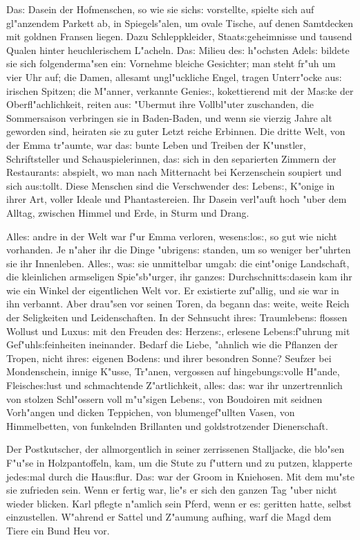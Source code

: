 \documentclass[oneside,12pt]{book}
\newcommand{\s}{s:}%
\begin{document}
Da{\s} Dasein der Hofmenschen, so wie sie sich{\s} vorstellte,
spielte sich auf gl"anzendem Parkett ab, in Spiegels"alen, um
ovale Tische, auf denen Samtdecken mit goldnen Fransen liegen.
Dazu Schleppkleider, Staat{\s}geheimnisse und tausend Qualen
hinter heuchlerischem L"acheln. Da{\s} Milieu de{\s} h"ochsten
Adel{\s} bildete sie sich folgenderma"sen ein: Vornehme bleiche
Gesichter; man steht fr"uh um vier Uhr auf; die Damen, allesamt
ungl"uckliche Engel, tragen Unterr"ocke au{\s} irischen Spitzen;
die M"anner, verkannte Genie{\s}, kokettierend mit der Ma{\s}ke
der Oberfl"achlichkeit, reiten au{\s} "Ubermut ihre Vollbl"uter
zuschanden, die Sommersaison verbringen sie in Baden-Baden, und
wenn sie vierzig Jahre alt geworden sind, heiraten sie zu guter
Letzt reiche Erbinnen. Die dritte Welt, von der Emma tr"aumte, war
da{\s} bunte Leben und Treiben der K"unstler, Schriftsteller und
Schauspielerinnen, da{\s} sich in den separierten Zimmern der
Restaurant{\s} abspielt, wo man nach Mitternacht bei Kerzenschein
soupiert und sich au{\s}tollt. Diese Menschen sind die
Verschwender de{\s} Leben{\s}, K"onige in ihrer Art, voller Ideale
und Phantastereien. Ihr Dasein verl"auft hoch "uber dem Alltag,
zwischen Himmel und Erde, in Sturm und Drang.

Alle{\s} andre in der Welt war f"ur Emma verloren,
wesen{\s}lo{\s}, so gut wie nicht vorhanden. Je n"aher ihr die
Dinge "ubrigen{\s} standen, um so weniger ber"uhrten sie ihr
Innenleben. Alle{\s}, wa{\s} sie unmittelbar umgab: die eint"onige
Landschaft, die kleinlichen armseligen Spie"sb"urger, ihr
ganze{\s} Durchschnitt{\s}dasein kam ihr wie ein Winkel der
eigentlichen Welt vor. Er existierte zuf"allig, und sie war in ihn
verbannt. Aber drau"sen vor seinen Toren, da begann da{\s} weite,
weite Reich der Seligkeiten und Leidenschaften. In der Sehnsucht
ihre{\s} Traumleben{\s} flossen Wollust und Luxu{\s} mit den
Freuden de{\s} Herzen{\s}, erlesene Leben{\s}f"uhrung mit
Gef"uhl{\s}feinheiten ineinander. Bedarf die Liebe, "ahnlich wie
die Pflanzen der Tropen, nicht ihre{\s} eigenen Boden{\s} und
ihrer besondren Sonne? Seufzer bei Mondenschein, innige K"usse,
Tr"anen, vergossen auf hingebung{\s}volle H"ande, Fleische{\s}lust
und schmachtende Z"artlichkeit, alle{\s} da{\s} war ihr
unzertrennlich von stolzen Schl"ossern voll m"u"sigen Leben{\s},
von Boudoiren mit seidnen Vorh"angen und dicken Teppichen, von
blumengef"ullten Vasen, von Himmelbetten, von funkelnden
Brillanten und goldstrotzender Dienerschaft.

Der Postkutscher, der allmorgentlich in seiner zerrissenen
Stalljacke, die blo"sen F"u"se in Holzpantoffeln, kam, um die
Stute zu f"uttern und zu putzen, klapperte jede{\s}mal durch die
Hau{\s}flur. Da{\s} war der Groom in Kniehosen. Mit dem mu"ste sie
zufrieden sein. Wenn er fertig war, lie"s er sich den ganzen Tag
"uber nicht wieder blicken. Karl pflegte n"amlich sein Pferd, wenn
er e{\s} geritten hatte, selbst einzustellen. W"ahrend er Sattel
und Z"aumung aufhing, warf die Magd dem Tiere ein Bund Heu vor.
\end{document}
